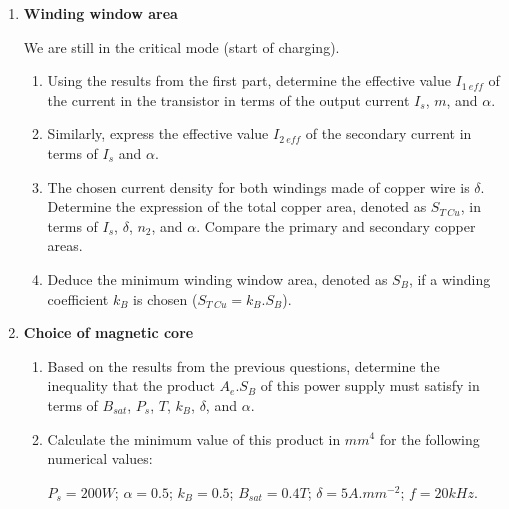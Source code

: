 \begin{enumerate}
\begin{enumerate}
\item Determine the expression of the maximum magnetic induction in the ferrite core in terms of $E$, $\alpha$, $T$, $n_1$, and $A_e$ (effective area of the core).
\item Deduce the expression of the minimum value $A_{e\ min}$ of the core area to prevent any saturation of the material. For this purpose, let $B_{sat}$ be the induction value near saturation.
\end{enumerate}

\item \textbf{Winding window area}

We are still in the critical mode (start of charging).

\begin{enumerate}
\item Using the results from the first part, determine the effective value $I_{1\ eff}$ of the current in the transistor in terms of the output current $I_s$, $m$, and $\alpha$.
\item Similarly, express the effective value $I_{2\ eff}$ of the secondary current in terms of $I_s$ and $\alpha$.
\item The chosen current density for both windings made of copper wire is $\delta$. Determine the expression of the total copper area, denoted as $S_{T\ Cu}$, in terms of $I_s$, $\delta$, $n_2$, and $\alpha$. Compare the primary and secondary copper areas.
\item Deduce the minimum winding window area, denoted as $S_B$, if a winding coefficient $k_B$ is chosen ($S_{T\ Cu} = k_B.S_B$).
\end{enumerate}

\item \textbf{Choice of magnetic core}

\begin{enumerate}
\item Based on the results from the previous questions, determine the inequality that the product $A_e.S_B$ of this power supply must satisfy in terms of $B_{sat}$, $P_s$, $T$, $k_B$, $\delta$, and $\alpha$.
\item Calculate the minimum value of this product in $mm^4$ for the following numerical values:

\begin{center}
$P_s = 200 W$; $\alpha = 0.5$; $k_B = 0.5$; $B_{sat} = 0.4 T$; $\delta = 5 A.mm^{-2}$; $f = 20 kHz$.
\end{center}


\end{enumerate}
\end{enumerate}
